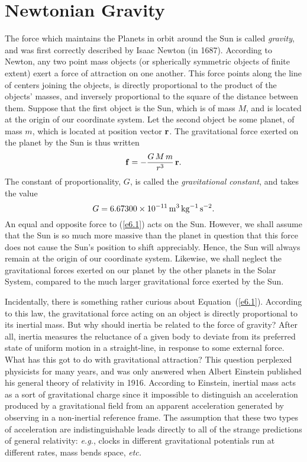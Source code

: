 \section{Newtonian Gravity}\label{snewt}
The force which maintains the Planets in orbit around the Sun is
called {\em gravity}, and was first correctly described by Isaac
Newton (in 1687). According to Newton, any two point mass objects (or spherically
symmetric objects of finite extent)
exert a force of attraction on one another.  This force points along the
line of centers joining the objects, is directly proportional to the product
of the objects' masses, and inversely proportional to the square of the distance between them. Suppose that the first object is the Sun, which is of mass $M$,
and is located at the origin of our coordinate system. Let the
second object be some planet,  of mass $m$, which is located
at position vector ${\bf r}$. The gravitational force exerted on the 
planet by the Sun is thus written
\begin{equation}\label{e6.1}
{\bf f} = - \frac{G\,M\,m}{r^3}\,{\bf r}.
\end{equation}
The constant of proportionality, $G$, is called the {\em gravitational constant},
and takes the value
\begin{equation}
G = 6.67300\times 10^{-11}\,{\rm m^3\,kg^{-1}\,s^{-2}}.
\end{equation}
An equal and opposite force to (\ref{e6.1}) acts on the Sun. However, we shall assume that
the Sun is so much more massive than the planet in question that this force does not
cause the Sun's position to shift  appreciably. Hence, the Sun will always remain
at the origin of our coordinate system. Likewise, we shall neglect the
 gravitational forces exerted on our planet by the other planets in the Solar System, compared to the much larger gravitational
force exerted by the Sun.

Incidentally, there is something rather curious about Equation~(\ref{e6.1}). According to
this law, the gravitational force acting on an object is directly proportional
to its inertial mass. But why should inertia be related to the force of
gravity? After all, inertia measures the reluctance of a given body to
deviate from its preferred state of uniform motion in a straight-line,
in response to some external force. What has this got to do with gravitational
attraction?
This question perplexed physicists for many years, and was only
answered when Albert Einstein published his general theory of relativity
in 1916. According to Einstein, inertial mass acts as a sort
of gravitational charge since it impossible to distinguish 
an acceleration produced by a gravitational field from an apparent acceleration
generated by observing in a non-inertial reference frame. The assumption that these
two types of acceleration are indistinguishable leads directly to all
of the strange predictions of general relativity: {\em e.g.}, 
clocks in different gravitational potentials run at different rates, 
mass bends space, {\em etc.}


